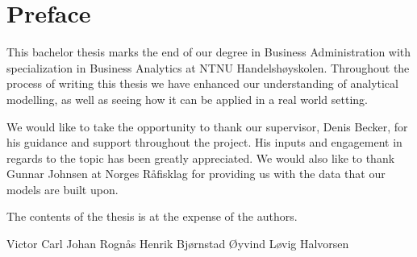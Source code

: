 \section*{Preface}

This bachelor thesis marks the end of our degree in Business Administration with specialization in Business Analytics at NTNU Handelshøyskolen. Throughout the process of writing this thesis we have enhanced our understanding of analytical modelling, as well as seeing how it can be applied in a real world setting. 

We would like to take the opportunity to thank our supervisor, Denis Becker, for his guidance and support throughout the project. His inputs and engagement in regards to the topic has been greatly appreciated. We would also like to thank Gunnar Johnsen at Norges Råfisklag for providing us with the data that our models are built upon.    

The contents of the thesis is at the expense of the authors. 

\vspace{5cm}

\begin{Form}
    \begin{spacing}{0.8}
    \begin{center}
        \noindent\makebox[\linewidth]{\rule{0.8\textwidth}{0pt}}
        \noindent\makebox[\linewidth]{\rule{0.8\textwidth}{0.4pt}}
        Victor Carl Johan Rognås
        \noindent\makebox[\linewidth]{\rule{0.8\textwidth}{0.4pt}}
        Henrik Bjørnstad
        \noindent\makebox[\linewidth]{\rule{0.8\textwidth}{0.4pt}}
        Øyvind Løvig Halvorsen
    \end{center}
    \end{spacing}
\end{Form}